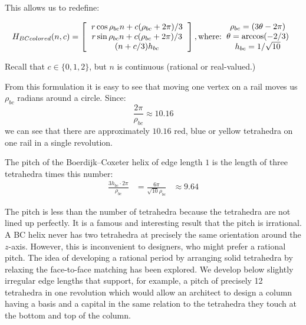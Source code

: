 \documentclass[11pt]{article}
\begin{document}
This allows us to redefine:

\begin{equation}
H_{BCcolored}(n,c) =
\left [
  \begin{tabular}{c}
    $ r  \cos{\rho_{bc} n + c (\rho_{bc} +  2 \pi) /3} $\\
   $ r  \sin{\rho_{bc} n + c (\rho_{bc} +  2 \pi) /3} $\\
   $ (n+c/3)  h_{bc} $
  \end{tabular}
  \right ],
\text{where:}
  \begin{tabular}{c}
    $\rho_{bc} = (3 \theta - 2 \pi)$ \\
    $ \theta = \arccos(-2/3) $ \\
    $ h_{bc} = 1/\sqrt{10} $ \\    
  \end{tabular}      
\end{equation}

Recall that $c \in \{0,1,2\}$, but $n$ is continuous (rational or real-valued.)

From this formulation it is easy to see that moving one vertex on a rail moves us $\rho_{bc}$ radians around a circle. Since:
\[ \frac{2 \pi}{\rho_{bc}} \approx 10.16
\]
we can see that there are approximately $10.16$ red, blue or yellow tetrahedra on one rail in a single revolution.

The pitch of the Boerdijk--Coxeter helix of edge length $1$ is the length of three tetrahedra times this number:
\begin{align*}
   \frac{3 h_{bc}\cdot  2 \pi }{\rho_{bc}} 
  &= \frac{6 \pi}{\sqrt{10}\rho_{bc}} 
  &\approx 9.64 
\end{align*}


The pitch is less than the number of tetrahedra because the tetrahedra
are not lined up perfectly.  It is a famous and interesting result
that the pitch is irrational. A BC helix never has two tetrahedra at
precisely the same orientation around the $z$-axis. However, this is
inconvenient to designers, who might prefer a rational pitch.
The idea of developing a rational period by arranging solid tetrahedra by relaxing the face-to-face matching
has been explored\cite{sadler2013periodic}. 
We develop below slightly irregular edge lengths that support, for example, a pitch of precisely 12
tetrahedra in one revolution which would allow an architect to design a
column having a basis and a capital in the same relation to the
tetrahedra they touch at the bottom and top of the column.
\end{document}
